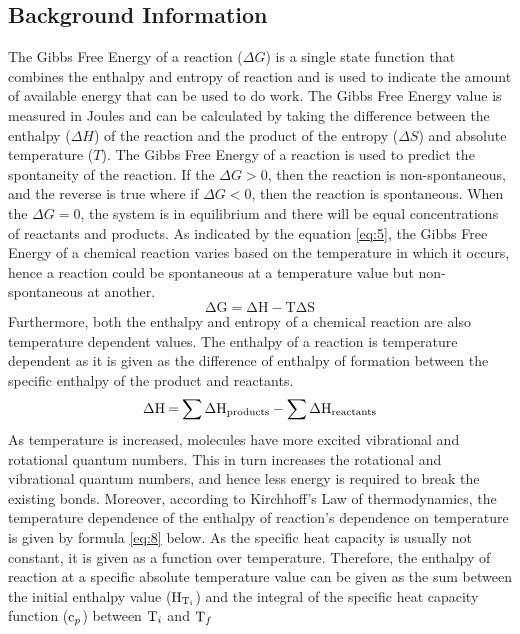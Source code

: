 \documentclass{article}
\begin{document}
\subsection{Background Information}
The Gibbs Free Energy of a reaction ($\Delta G$) is a single state function that combines the enthalpy and entropy of reaction and is used to indicate the amount of available energy that can be used to do work. The Gibbs Free Energy value is measured in Joules and can be calculated by taking the difference between the enthalpy ($\Delta H$) of the reaction and the product of the entropy ($\Delta S$) and absolute temperature ($T$). The Gibbs Free Energy of a reaction is used to predict the spontaneity of the reaction.  If the $\Delta G > 0$, then the reaction is non-spontaneous, and the reverse is true where if $\Delta G < 0$, then the reaction is spontaneous. When the $\Delta G = 0$, the system is in equilibrium and there will be equal concentrations of reactants and products. As indicated by the equation \ref{eq:5}, the Gibbs Free Energy of a chemical reaction varies based on the temperature in which it occurs, hence a reaction could be spontaneous at a temperature value but non-spontaneous at another. 
\begin{equation}
\mathrm{\Delta G = \Delta H - T \Delta S } \label{eq:5}
\end{equation}
Furthermore, both the enthalpy and entropy of a chemical reaction are also temperature dependent values. The enthalpy of a reaction is temperature dependent as it is given as the difference of enthalpy of formation between the specific enthalpy of the product and reactants. 
\begin{equation}
\ce{\Delta H = \sum{\Delta H_{products}} - \sum{\Delta H_{reactants}}} \label{eq:9}
\end{equation}
As temperature is increased, molecules have more excited vibrational and rotational quantum numbers. This in turn increases the rotational and vibrational quantum numbers, and hence less energy is required to break the existing bonds. Moreover, according to Kirchhoff's Law of thermodynamics, the temperature dependence of the enthalpy of reaction's dependence on temperature is given by formula \ref{eq:8} below. As the specific heat capacity is usually not constant, it is given as a function over temperature. Therefore, the enthalpy of reaction at a specific absolute temperature value can be given as the sum between the initial enthalpy value ($\ce{H_{T_i}}$) and the integral of the specific heat capacity function ($\ce{c_p}$) between $\ce{T_i}$ and $\ce{T_f}$
\end{document}

